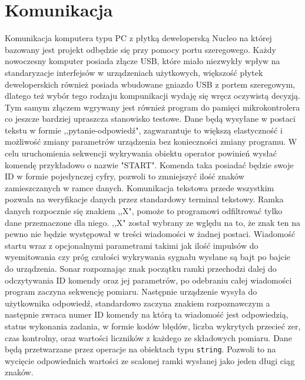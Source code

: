 \section{Komunikacja}
Komunikacja komputera typu PC z płytką deweloperską Nucleo na której bazowany jest projekt odbędzie się przy pomocy portu szeregowego. 
Każdy nowoczesny komputer posiada złącze USB, które miało niezwykły wpływ na standaryzacje interfejsów w urządzeniach użytkowych, 
większość płytek deweloperskich również posiada wbudowane gniazdo USB z portem szeregowym, dlatego też wybór tego rodzaju kompunikacji wydaję się wręcz oczywistą decyzją.
Tym samym złączem wgrywany jest również program do pamięci mikrokontrolera co jeszcze bardziej upraszcza stanowisko testowe.
Dane będą wysyłane w postaci tekstu w formie ,,pytanie-odpowiedź", zagwarantuje to większą elastyczność i możliwość zmiany parametrów urządzenia bez konieczności zmiany programu. 
W celu uruchomienia sekwencji wykrywania obiektu operator powinień wysłać komendę przykładowo o nazwie "START". 
Komenda taka posiadać będzie swoje ID w formie pojedynczej cyfry, pozwoli to zmniejszyć ilość znaków zamieszczanych w ramce danych. 
Komunikacja tekstowa przede wszystkim pozwala na weryfikacje danych przez standardowy terminal tekstowy. 
Ramka danych rozpocznie się znakiem ,,X", pomoże to programowi odfiltrować tylko dane przeznaczone dla niego. ,,X" został wybrany ze wględu na to, 
że znak ten na pewno nie będzie występował w treści wiadomości w żadnej postaci.
Wiadomość startu wraz z opcjonalnymi parametrami takimi jak ilość impulsów do wyemitowania czy próg czułości wykrywania sygnału wysłane są bajt po bajcie do urządzenia. 
Sonar rozpoznając znak początku ramki przechodzi dalej do odczytywania ID komendy oraz jej parametrów, po odebraniu całej wiadomości program zaczyna sekwencję pomiaru.
Następnie urządzenie wysyła do użytkownika odpowiedź, standardowo zaczyna znakiem rozpoznawczym a następnie zwraca numer ID komendy na którą ta wiadomość jest odpowiedzią,
status wykonania zadania, w formie kodów błędów, liczba wykrytych przecieć zer, czas kontrolny, oraz wartości liczników z każdego ze składowych pomiaru.
Dane będą przetwarzane przez operacje na obiektach typu {\tt string}. Pozwoli to na wycięcie odpowiednich wartości ze scalonej ramki wysłanej jako jeden długi ciąg znaków.




